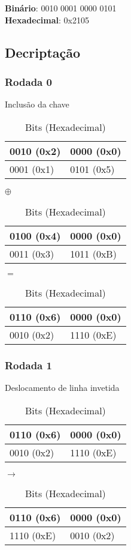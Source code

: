 \documentclass[
    article,            %
    11pt,               %
    oneside,            %
    a4paper,            %
    english,            %
    brazil,             %
    sumario=tradicional,
    ]{abntex2}
\begin{document}
\label{subsubsub:texto-cifrado-s-aes}
\indent\textbf{Binário}: 0010 0001 0000 0101\\
\indent\textbf{Hexadecimal}: 0x2105


\subsection{\textbf{Decriptação}}
\label{sub:decriptacao}

\subsubsection{\textbf{Rodada 0}}
\label{subsub:rodada0-dec}

\label{subsubsub:include-key-round0-dec}

\begin{table}[H]
\centering
\caption{Inclusão da chave}
\label{table-key_include-round0-dec}
\begin{tabular}{|l|l|}
\hline
0010 (0x2) & 0000 (0x0) \\ \hline
0001 (0x1) & 0101 (0x5) \\ \hline
\end{tabular}
$\oplus$
\begin{tabular}{|l|l|}
\hline
0100 (0x4) & 0000 (0x0) \\ \hline
0011 (0x3) & 1011 (0xB) \\ \hline
\end{tabular}
$=$
\begin{tabular}{|l|l|}
\hline
0110 (0x6) & 0000 (0x0) \\ \hline
0010 (0x2) & 1110 (0xE) \\ \hline
\end{tabular}
\caption*{Bits (Hexadecimal)}
\end{table}

\subsubsection{\textbf{Rodada 1}}
\label{subsub:rodada1-dec}

\label{subsubsub:deslocar-linha-round1-dec}

\begin{table}[H]
\centering
\caption{Deslocamento de linha invetida}
\label{tabela-desloc-linha-round1-dec}
\begin{tabular}{|l|l|}
\hline
0110 (0x6) & 0000 (0x0) \\ \hline
0010 (0x2) & 1110 (0xE) \\ \hline
\end{tabular}
$\longrightarrow$
\begin{tabular}{|l|l|}
\hline
0110 (0x6) & 0000 (0x0) \\ \hline
1110 (0xE) & 0010 (0x2) \\ \hline
\end{tabular}
\caption*{Bits (Hexadecimal)}
\end{table}
\end{document}
